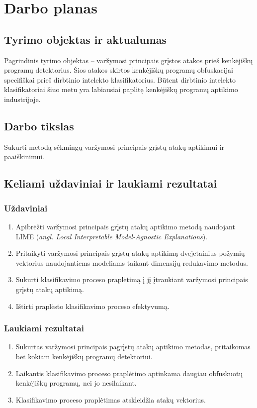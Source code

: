 \section{Darbo planas}

\subsection{Tyrimo objektas ir aktualumas}

Pagrindinis tyrimo objektas -- varžymosi principais grįstos atakos prieš
kenkėjiškų programų detektorius. Šios atakos skirtos kenkėjiškų programų
obfuskacijai specifiškai prieš dirbtinio intelekto klasifikatorius. Būtent
dirbtinio intelekto klasifikatoriai šiuo metu yra labiausiai paplitę kenkėjiškų
programų aptikimo industrijoje.

\subsection{Darbo tikslas}

Sukurti metodą sėkmingų varžymosi principais grįstų atakų aptikimui ir
paaiškinimui.

\subsection{Keliami uždaviniai ir laukiami rezultatai}

\subsubsection{Uždaviniai}
\begin{enumerate}
    \item Apibrėžti varžymosi principais grįstų atakų aptikimo metodą naudojant LIME (\textit{angl. Local Interpretable Model-Agnostic Explanations}).
    \item Pritaikyti varžymosi principais grįstų atakų aptikimą dvejetainius požymių vektorius naudojantiems modeliams taikant dimensijų redukavimo metodus.
    \item Sukurti klasifikavimo proceso praplėtimą į jį įtraukiant varžymosi principais
          grįstų atakų aptikimą.
    \item Ištirti praplėsto klasifikavimo proceso efektyvumą.
\end{enumerate}

\subsubsection{Laukiami rezultatai}
\begin{enumerate}
    \item Sukurtas varžymosi principais pagrįstų atakų aptikimo metodas, pritaikomas bet kokiam kenkėjiškų programų detektoriui.
    \item Laikantis klasifikavimo proceso praplėtimo aptinkama daugiau obfuskuotų kenkėjiškų programų, nei jo nesilaikant.
    \item Klasifikavimo proceso praplėtimas atskleidžia atakų vektorius.
\end{enumerate}

